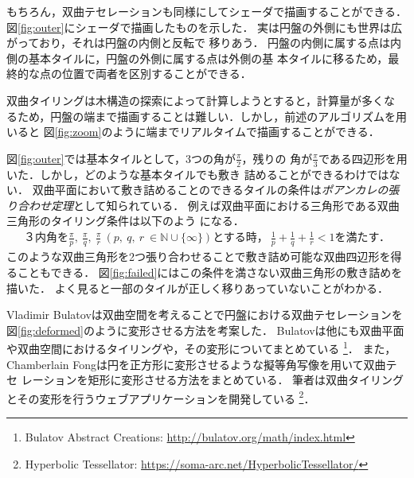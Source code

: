 もちろん，双曲テセレーションも同様にしてシェーダで描画することができる．
図\ref{fig:outer}にシェーダで描画したものを示した．
実は円盤の外側にも世界は広がっており，それは円盤の内側と反転で
移りあう．
円盤の内側に属する点は内側の基本タイルに，円盤の外側に属する点は外側の基
本タイルに移るため，最終的な点の位置で両者を区別することができる．

双曲タイリングは木構造の探索によって計算しようとすると，計算量が多くな
るため，円盤の端まで描画することは難しい．しかし，前述のアルゴリズムを用いると
図\ref{fig:zoom}のように端までリアルタイムで描画することができる．

図\ref{fig:outer}では基本タイルとして，3つの角が$\frac{\pi}{2}$，残りの
角が$\frac{\pi}{3}$である四辺形を用いた．しかし，どのような基本タイルでも敷き
詰めることができるわけではない．
双曲平面において敷き詰めることのできるタイルの条件は\emph{ポアンカレの張
り合わせ定理}として知られている．
例えば双曲平面における三角形である双曲三角形のタイリング条件は以下のよう
になる．
\begin{eqnarray*}
\text{３内角を}\frac{\pi}{p},~\frac{\pi}{q},~\frac{\pi}{r}~(p,~q,~r~\in
 \mathbb{N} \cup \{\infty\}) \text{とする時，}~
 \frac{1}{p} + \frac{1}{q} + \frac{1}{r} < 1 \text{を満たす．}
\end{eqnarray*}
このような双曲三角形を2つ張り合わせることで敷き詰め可能な双曲四辺形を得
ることもできる．
図\ref{fig:failed}にはこの条件を満さない双曲三角形の敷き詰めを描いた．
よく見ると一部のタイルが正しく移りあっていないことがわかる．

Vladimir Bulatovは双曲空間を考えることで円盤における双曲テセレーションを
図\ref{fig:deformed}のように変形させる方法を考案した\cite{bridges2013-167}\cite{bridges2011-479}．
Bulatovは他にも双曲平面や双曲空間におけるタイリングや，その変形についてまとめている
\footnote{Bulatov Abstract Creations:
\url{http://bulatov.org/math/index.html}}．
また，Chamberlain Fongは円を正方形に変形させるような擬等角写像を用いて双曲テセ
レーションを矩形に変形させる方法をまとめている\cite{bridges2016-179}．
筆者は双曲タイリングとその変形を行うウェブアプリケーションを開発している
\footnote{Hyperbolic Tessellator: \url{https://soma-arc.net/HyperbolicTessellator/}}．

